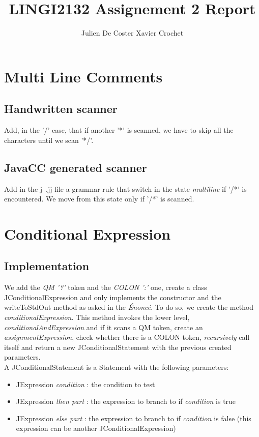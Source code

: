 \documentclass[10pt,a4paper]{article}
\author{Julien De Coster Xavier Crochet}
\title{LINGI2132 Assignement 2 Report}
\begin{document}
\maketitle
\section{Multi Line Comments}
\subsection{Handwritten scanner}
Add, in the '/' case, that if another '*' is scanned, we have to skip all the characters until we scan '*/'. 
\subsection{JavaCC generated scanner}
Add in the j--.jj file a grammar rule that switch in the state \textit{multiline} if '/*' is encountered. We move from this state only if '/*' is scanned. 
\section{Conditional Expression}
\subsection{Implementation}
We add the \textit{QM '?'} token and the \textit{COLON  ':'} one, create a class JConditionalExpression and only implements the constructor and the writeToStdOut method as asked in the \textit{Énoncé}. To do so, we create the method \textit{conditionalExpression}. This method invokes the lower level, \textit{conditionalAndExpression} and if it scans a QM token, create an \textit{assignmentExpression}, check whether there is a COLON token, \textit{recursively} call itself and return a new JConditionalStatement with the previous created parameters.\\
A JConditionalStatement is a Statement with the following parameters:
\begin{itemize}
\item{JExpression \textit{condition} : the condition to test}
\item{JExpression \textit{then part} : the expression to branch to if \textit{condition} is true}
\item{JExpression \textit{else part} : the expression to branch to if \textit{condition} is false (this expression can be another JConditionalExpression)}
\end{itemize}
\end{document}
